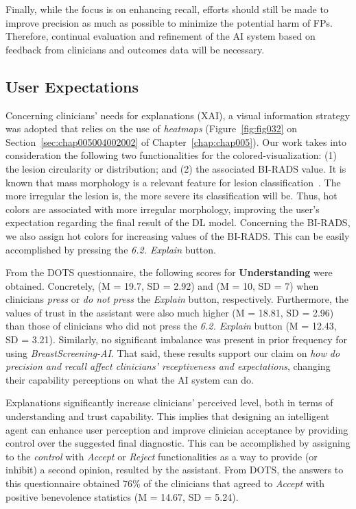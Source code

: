 Finally, while the focus is on enhancing recall, efforts should still be made to improve precision as much as possible to minimize the potential harm of \acp{FP}.
Therefore, continual evaluation and refinement of the \ac{AI} system based on feedback from clinicians and outcomes data will be necessary.

\subsection{User Expectations}
\label{sec:app003004007}

Concerning clinicians' needs for explanations (\acs{XAI}), a visual information strategy was adopted that relies on the use of {\it heatmaps} (Figure~\ref{fig:fig032} on Section~\ref{sec:chap005004002002} of Chapter~\ref{chap:chap005}).
Our work takes into consideration the following two functionalities for the colored-visualization:
(1) the lesion circularity or distribution; and
(2) the associated \ac{BI-RADS} value.
It is known that mass morphology is a relevant feature for lesion classification~\cite{maicas2018training}.
The more irregular the lesion is, the more severe its classification will be.
Thus, hot colors are associated with more irregular morphology, improving the user's expectation regarding the final result of the \ac{DL} model.
Concerning the \ac{BI-RADS}, we also assign hot colors for increasing values of the \ac{BI-RADS}. 
This can be easily accomplished by pressing the {\it 6.2. Explain} button.

From the \ac{DOTS} questionnaire, the following scores for {\bf Understanding} were obtained.
Concretely, (M = 19.7, SD = 2.92) and (M = 10, SD = 7) when clinicians {\it press} or {\it do not press} the  {\it Explain} button, respectively.
Furthermore, the values of trust in the assistant were also much higher (M = 18.81, SD = 2.96) than those of clinicians who did not press the {\it 6.2. Explain} button (M = 12.43, SD = 3.21).
Similarly, no significant imbalance was present in prior frequency for using {\it BreastScreening-AI}.
That said, these results support our claim on {\it how do precision and recall affect clinicians' receptiveness and expectations}, changing their capability perceptions on what the \ac{AI} system can do.

Explanations significantly increase clinicians’ perceived level, both in terms of understanding and trust capability.
This implies that designing an intelligent agent can enhance user perception and improve clinician acceptance by providing control over the suggested final diagnostic.
This can be accomplished by assigning to the {\it control} with {\it Accept} or {\it Reject} functionalities as a way to provide (or inhibit) a second opinion, resulted by the assistant.
From \ac{DOTS}, the answers to this questionnaire obtained 76\% of the clinicians that agreed to {\it Accept} with positive benevolence statistics (M = 14.67, SD = 5.24).

